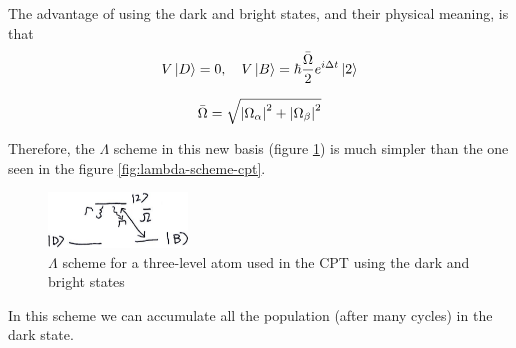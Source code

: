 The advantage of using the dark and bright states, and their physical meaning, is that
\begin{align*}
	V \ket{D} = 0 \qc V \ket{B} = \hbar \frac{\bar{\Omega}}{2} e^{i \Delta t} \ket{2}
\end{align*}

\begin{defi}
	\begin{align}
		\bar{\Omega} = \sqrt{ \abs{\Omega_{\alpha}}^{2} + \abs{\Omega_{\beta}}^{2} }
	\end{align}
\end{defi}

Therefore, the $\Lambda$ scheme in this new basis (figure \ref{fig:lambda-dark-bright}) is much simpler than the one seen in the figure \ref{fig:lambda-scheme-cpt}.
\begin{figure}[H]
	\centering
	\includegraphics[width=0.33\textwidth]{./images/3-lambda-dark-bright}
	\caption{$\Lambda$ scheme for a three-level atom used in the CPT using the dark and bright states}
	\label{fig:lambda-dark-bright}
\end{figure}

In this scheme we can accumulate all the population (after many cycles) in the dark state.

